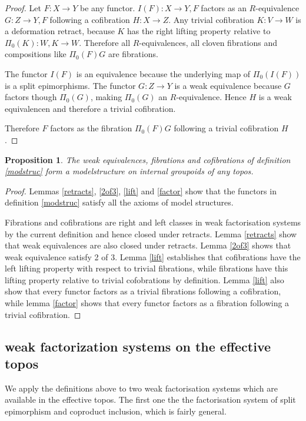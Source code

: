 \documentclass{amsart}
\theoremstyle{plain}
\newtheorem{prop}[theorem]{Proposition}
\theoremstyle{definition}
\begin{document}
\begin{proof} Let $F:X\to Y$ be any functor. $I(F):X\to Y\comma F$ factors as an $R$-equivalence $G:Z\to Y\comma F$ following a cofibration $H:X\to Z$. Any trivial cofibration $K: V\to W$ is a deformation retract, because $K$ has the right lifting property relative to $\Pi_0(K): W\comma K \to W$. Therefore all $R$-equivalences, all cloven fibrations and compositions like $\Pi_0(F)G$ are fibrations.%

The functor $I(F)$ is an equivalence because the underlying map of $\Pi_0(I(F))$ is a split epimorphisms. The functor $G:Z\to Y$ is a weak equivalence because $G$ factors though $\Pi_0(G)$, making $\Pi_0(G)$ an $R$-equivalence. Hence $H$ is a weak equivalencen and therefore a trivial cofibration.

Therefore $F$ factors as the fibration $\Pi_0(F)G$ following a trivial cofibration $H$.
\end{proof}

\begin{prop} The weak equivalences, fibrations and cofibrations of definition \ref{modstruc} form a modelstructure on internal groupoids of any topos. \end{prop}

\begin{proof} Lemmas \ref{retracts}, \ref{2of3}, \ref{lift} and \ref{factor} show that the functors in definition \ref{modstruc} satisfy all the axioms of model structures. 

Fibrations and cofibrations are right and left classes in weak factorisation systems by the current definition and hence closed under retracts. Lemma \ref{retracts} show that weak equivalences are also closed under retracts. Lemma \ref{2of3} shows that weak equivalence satisfy 2 of 3. Lemma \ref{lift} establishes that cofibrations have the left lifting property with respect to trivial fibrations, while fibrations have this lifting property relative to trivial cofobrations by definition. Lemma \ref{lift} also show that every functor factors as a trivial fibrations following a cofibration, while lemma \ref{factor} shows that every functor factors as a fibration following a trivial cofibration. \end{proof}

\subsection{weak factorization systems on the effective topos}
We apply the definitions above to two weak factorisation systems which are available in the effective topos. The first one the the factorisation system of split epimorphism and coproduct inclusion, which is fairly general.
\end{document}
